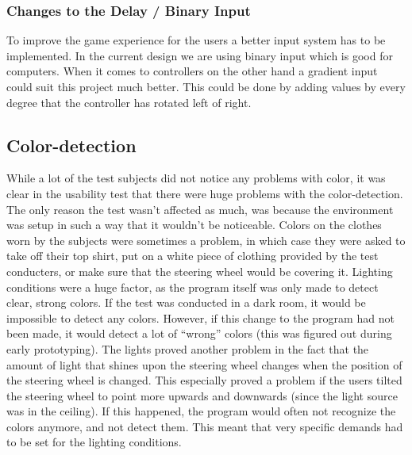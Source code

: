 \subsubsection*{Changes to the Delay / Binary Input}
To improve the game experience for the users a better input system has to be implemented. In the current design we are using binary input which is good for computers. When it comes to controllers on the other hand a gradient input could suit this project much better. This could be done by adding values by every degree that the controller has rotated left of right.


\subsection{Color-detection}
While a lot of the test subjects did not notice any problems with color, it was clear in the usability test that there were huge problems with the color-detection. The only reason the test wasn’t affected as much, was because the environment was setup in such a way that it wouldn’t be noticeable.
Colors on the clothes worn by the subjects were sometimes a problem, in which case they were asked to take off their top shirt, put on a white piece of clothing provided by the test conducters, or make sure that the steering wheel would be covering it.
Lighting conditions were a huge factor, as the program itself was only made to detect clear, strong colors. If the test was conducted in a dark room, it would be impossible to detect any colors. However, if this change to the program had not been made, it would detect a lot of “wrong” colors (this was figured out during early prototyping).
The lights proved another problem in the fact that the amount of light that shines upon the steering wheel changes when the position of the steering wheel is changed. This especially proved a problem if the users tilted the steering wheel to point more upwards and downwards (since the light source was in the ceiling). If this happened, the program would often not recognize the colors anymore, and not detect them. This meant that very specific demands had to be set for the lighting conditions.

